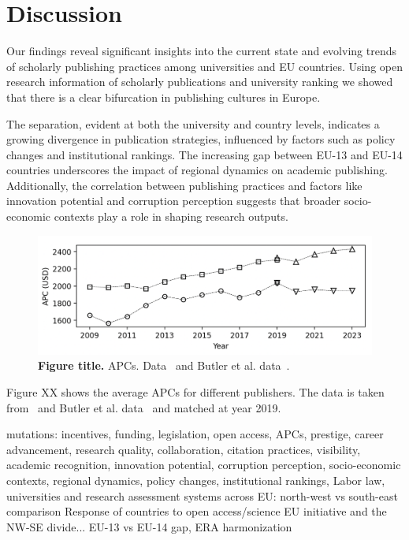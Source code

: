 \documentclass[amsfonts, amssymb, prl, superscriptaddress, notitlepage, twocolumn, nofootinbib]{revtex4-2}
\begin{document}
\section{Discussion}
Our findings reveal significant insights into the current state and evolving trends of scholarly publishing practices among universities and EU countries. Using open research information of scholarly publications and university ranking we showed that there is a clear bifurcation in publishing cultures in Europe. 

The separation, evident at both the university and country levels, indicates a growing divergence in publication strategies, influenced by factors such as policy changes and institutional rankings. The increasing gap between EU-13 and EU-14 countries underscores the impact of regional dynamics on academic publishing. Additionally, the correlation between publishing practices and factors like innovation potential and corruption perception suggests that broader socio-economic contexts play a role in shaping research outputs. 



\begin{figure}
    \centering
    \includegraphics[width=.95\linewidth]{Fig06f.png}
    \caption{\label{fig:fig7} {\bf Figure title.} APCs. Data~\cite{kbel_ross-hellauer_2022} and Butler et al. data~\cite{butler2024,haustein2024estimating}.
}
\end{figure}

Figure XX shows the average APCs for different publishers. The data is taken from~\cite{kbel_ross-hellauer_2022} and Butler et al. data~\cite{butler2024,haustein2024estimating} and matched at year 2019. 

mutations: incentives, funding, legislation, open access, APCs, prestige, career advancement, research quality, collaboration, citation practices, visibility, academic recognition, innovation potential, corruption perception, socio-economic contexts, regional dynamics, policy changes, institutional rankings,
Labor law, universities and research assessment systems across EU: north-west vs south-east comparison 
Response of countries to open access/science EU initiative and the NW-SE divide... EU-13 vs EU-14 gap, ERA harmonization
  
\end{document}
